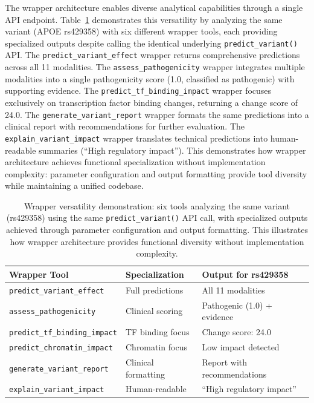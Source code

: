 \documentclass[11pt]{article}
\begin{document}
The wrapper architecture enables diverse analytical capabilities through a single API endpoint. Table~\ref{tab:wrapper} demonstrates this versatility by analyzing the same variant (APOE rs429358) with six different wrapper tools, each providing specialized outputs despite calling the identical underlying \texttt{predict\_variant()} API. The \texttt{predict\_variant\_effect} wrapper returns comprehensive predictions across all 11 modalities. The \texttt{assess\_pathogenicity} wrapper integrates multiple modalities into a single pathogenicity score (1.0, classified as pathogenic) with supporting evidence. The \texttt{predict\_tf\_binding\_impact} wrapper focuses exclusively on transcription factor binding changes, returning a change score of 24.0. The \texttt{generate\_variant\_report} wrapper formats the same predictions into a clinical report with recommendations for further evaluation. The \texttt{explain\_variant\_impact} wrapper translates technical predictions into human-readable summaries (``High regulatory impact''). This demonstrates how wrapper architecture achieves functional specialization without implementation complexity: parameter configuration and output formatting provide tool diversity while maintaining a unified codebase.

\begin{table}[h]
\centering
\small
\begin{tabular}{lll}
\toprule
\textbf{Wrapper Tool} & \textbf{Specialization} & \textbf{Output for rs429358} \\
\midrule
\texttt{predict\_variant\_effect} & Full predictions & All 11 modalities \\
\texttt{assess\_pathogenicity} & Clinical scoring & Pathogenic (1.0) + evidence \\
\texttt{predict\_tf\_binding\_impact} & TF binding focus & Change score: 24.0 \\
\texttt{predict\_chromatin\_impact} & Chromatin focus & Low impact detected \\
\texttt{generate\_variant\_report} & Clinical formatting & Report with recommendations \\
\texttt{explain\_variant\_impact} & Human-readable & ``High regulatory impact'' \\
\bottomrule
\end{tabular}
\caption{Wrapper versatility demonstration: six tools analyzing the same variant (rs429358) using the same \texttt{predict\_variant()} API call, with specialized outputs achieved through parameter configuration and output formatting. This illustrates how wrapper architecture provides functional diversity without implementation complexity.}
\label{tab:wrapper}
\end{table}
\end{document}
